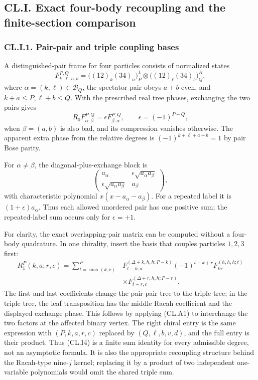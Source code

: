 \hypertarget{cl.i.-exact-four-body-recoupling-and-the-finite-section-comparison}{%
\subsection{CL.I. Exact four-body recoupling and the finite-section comparison}\label{cl.i.-exact-four-body-recoupling-and-the-finite-section-comparison}}

\hypertarget{cl.i.1.-pair-pair-and-triple-coupling-bases}{%
\subsubsection{CL.I.1. Pair-pair and triple coupling bases}\label{cl.i.1.-pair-pair-and-triple-coupling-bases}}

A distinguished-pair frame for four particles consists of normalized states \[
F_{k,\ell;a,b}^{P,Q}
=\bigl((12)_k(34)_a\bigr)_P^L
 \otimes\bigl((12)_\ell(34)_b\bigr)_Q^R,
\tag{CL.I1}
\] where \(\alpha=(k,\ell)\in\mathcal B_Q\), the spectator pair obeys \(a+b\) even, and \(k+a\leq P,\ell+b\leq Q\). With the prescribed real tree phases, exchanging the two pairs gives \[
R_0F_{\alpha;\beta}^{P,Q}
=\epsilon F_{\beta;\alpha}^{P,Q},\qquad
\epsilon=(-1)^{P+Q},
\tag{CL.I2}
\] when \(\beta=(a,b)\) is also bad, and its compression vanishes otherwise. The apparent extra phase from the relative degrees is \((-1)^{k+\ell+a+b}=1\) by pair Bose parity.

For \(\alpha\ne\beta\), the diagonal-plus-exchange block is \[
\begin{pmatrix}
a_\alpha&\epsilon\sqrt{a_\alpha a_\beta}\\
\epsilon\sqrt{a_\alpha a_\beta}&a_\beta
\end{pmatrix},
\tag{CL.I3}
\] with characteristic polynomial \(x(x-a_\alpha-a_\beta)\). For a repeated label it is \((1+\epsilon)a_\alpha\). Thus each allowed unordered pair has one positive sum; the repeated-label sum occurs only for \(\epsilon=+1\).

For clarity, the exact overlapping-pair matrix can be computed without a four-body quadrature. In one chirality, insert the basis that couples particles \(1,2,3\) first: \[
\begin{split}
R_1^P(k,a;r,c)
=\sum_{t=\max(k,r)}^P
&F_{t-k,a}^{(\Delta+k,h,h;P-k)}
(-1)^{t+k+r}F_{kr}^{(h,h,h;t)}\\
&\times F_{t-r,c}^{(\Delta+r,h,h;P-r)}.
\end{split}
\tag{CL.I4}
\] The first and last coefficients change the pair-pair tree to the triple tree; in the triple tree, the leaf transposition has the middle Racah coefficient and the displayed exchange phase. This follows by applying (CL.A1) to interchange the two factors at the affected binary vertex. The right chiral entry is the same expression with \((P,k,a,r,c)\) replaced by \((Q,\ell,b,v,d)\), and the full entry is their product. Thus (CL.I4) is a finite sum identity for every admissible degree, not an asymptotic formula. It is also the appropriate recoupling structure behind the Racah-type nine-\(j\) kernel; replacing it by a product of two independent one-variable polynomials would omit the shared triple sum.

